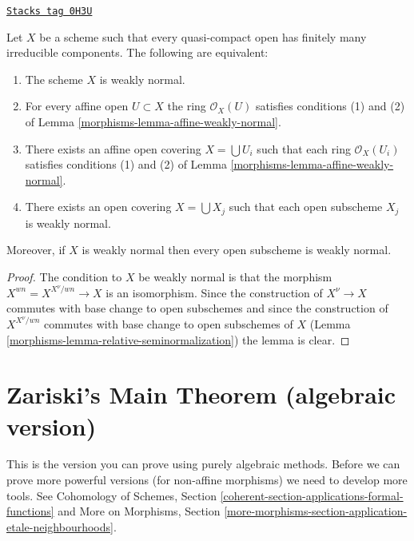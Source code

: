 \begin{lemma}
\label{morphisms-lemma-locally-weakly-normal}
\href{https://stacks.math.columbia.edu/tag/0H3U}{\texttt{Stacks tag 0H3U}}

Let $X$ be a scheme such that every quasi-compact open has
finitely many irreducible components. The following are equivalent:
\begin{enumerate}
\item The scheme $X$ is weakly normal.
\item For every affine open $U \subset X$ the ring $\mathcal{O}_X(U)$
satisfies conditions (1) and (2) of Lemma \ref{morphisms-lemma-affine-weakly-normal}.
\item There exists an affine open covering $X = \bigcup U_i$ such that
each ring $\mathcal{O}_X(U_i)$
satisfies conditions (1) and (2) of Lemma \ref{morphisms-lemma-affine-weakly-normal}.
\item There exists an open covering $X = \bigcup X_j$
such that each open subscheme $X_j$ is weakly normal.
\end{enumerate}
Moreover, if $X$ is weakly normal then every open subscheme is weakly normal.
\end{lemma}

\begin{proof}

The condition to $X$ be weakly normal is that the morphism
$X^{wn} = X^{X^\nu/wn} \to X$ is an isomorphism. Since the construction
of $X^\nu \to X$ commutes with base change to open subschemes
and since the construction of $X^{X^\nu/wn}$ commutes with base
change to open subschemes of $X$ (Lemma \ref{morphisms-lemma-relative-seminormalization})
the lemma is clear.
\end{proof}

\section{Zariski's Main Theorem (algebraic version)}
\label{morphisms-section-Zariski}
This is the version you can prove using purely algebraic methods.
Before we can prove more powerful versions (for non-affine morphisms)
we need to develop more tools. See Cohomology of Schemes, Section
\ref{coherent-section-applications-formal-functions}
and
More on Morphisms, Section
\ref{more-morphisms-section-application-etale-neighbourhoods}.

